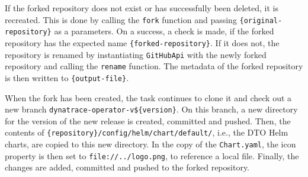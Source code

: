 If the forked repository does not exist or has successfully been deleted, it is recreated.
This is done by calling the \verb|fork| function and passing \verb|{original-repository}| as a parameters.
On a success, a check is made, if the forked repository has the expected name \verb|{forked-repository}|.
If it does not, the repository is renamed by instantiating \verb|GitHubApi| with the newly forked repository and calling the \verb|rename| function.
The metadata of the forked repository is then written to \verb|{output-file}|.

When the fork has been created, the task continues to clone it and check out a new branch \verb|dynatrace-operator-v${version}|.
On this branch, a new directory for the version of the new release is created, committed and pushed.
Then, the contents of \verb|{repository}/config/helm/chart/default/|, i.e., the DTO Helm charts, are copied to this new directory.
In the copy of the \verb|Chart.yaml|, the icon property is then set to \verb|file://../logo.png|, to reference a local file.
Finally, the changes are added, committed and pushed to the forked repository.
